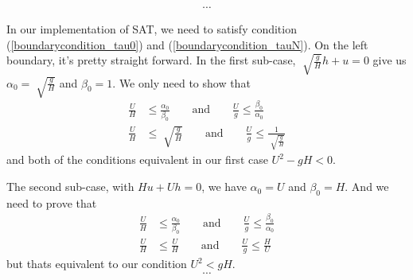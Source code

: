 \documentclass{article}
\theoremstyle{definition}
\begin{document}
    $$ \cdots $$ 

    In our implementation of SAT, we need to satisfy condition
    (\ref{boundarycondition_tau0}) and (\ref{boundarycondition_tauN}). 
    On the left boundary, it's pretty straight forward.
    In the first sub-case, $\sqrt[]{\frac gH} h + u =0$ 
    give us $\alpha_0 = \sqrt[]{\frac{g}{H}}$ and $\beta_0 = 1$. 
    We only need to show that 
    \begin{align}
        \frac{U}{H} &\leq \frac{\alpha_0}{\beta_0} 
        \qquad \text{and}  \qquad 
        \frac{U}{g} \leq \frac{\beta_0}{\alpha_0} \\
        \frac{U}{H} &\leq \sqrt[]{\frac{g}{H}}
        \qquad \text{and}  \qquad 
        \frac{U}{g} \leq \frac{1}{\sqrt[]{\frac{g}{H}}}
    \end{align}
    and both of the conditions equivalent in our first case $U^2 - gH < 0$. 

    The second sub-case, with $Hu + Uh = 0$, we have $\alpha_0 = U$ and $\beta_0 = H$. 
    And we need to prove that 
    \begin{align}
        \frac{U}{H} &\leq \frac{\alpha_0}{\beta_0} 
        \qquad \text{and}  \qquad 
        \frac{U}{g} \leq \frac{\beta_0}{\alpha_0} \\
        \frac{U}{H} &\leq \frac{U}{H}
        \qquad \text{and}  \qquad 
        \frac{U}{g} \leq \frac{H}{U}
    \end{align}
    but thats equivalent to our condition $U^2 < gH$. 
    $$ \cdots $$ 
\end{document}
